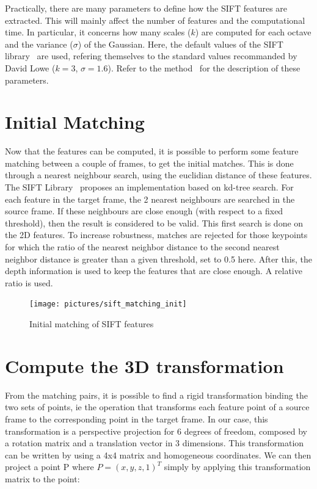 Practically, there are many parameters to define how the SIFT features are extracted. This will mainly affect the number of features and the computational time. In particular, it concerns how many scales ($k$) are computed for each octave and the variance ($\sigma$) of the Gaussian. Here, the default values of the SIFT library~\cite{hess_sift} are used, refering themselves to the standard values recommanded by David Lowe ($k=3$, $\sigma=1.6$). Refer to the method~\cite{lowe_2004_sift} for the description of these parameters.

\section{Initial Matching}

Now that the features can be computed, it is possible to perform some feature matching between a couple of frames, to get the initial matches. This is done through a nearest neighbour search, using the euclidian distance of these features.  
The SIFT Library~\cite{hess_sift} proposes an implementation based on kd-tree search. For each feature in the target frame, the 2 nearest neighbours are searched in the source frame. If these neighbours are close enough (with respect to a fixed threshold), then the result is considered to be valid. This first search is done on the 2D features. To increase robustness, matches are rejected for those keypoints for which the ratio of the nearest neighbor distance to the second nearest neighbor distance is greater than a given threshold, set to 0.5 here. 
After this, the depth information is used to keep the features that are close enough. A relative ratio is used.

\begin{figure}[h!]
\centering
\texttt{[image: pictures/sift\_matching\_init]}
\caption{Initial matching of SIFT features}
\end{figure}

\section{Compute the 3D transformation}

From the matching pairs, it is possible to find a rigid transformation binding the two sets of points, ie the operation that transforms each feature point of a source frame to the corresponding point in the target frame. In our case, this transformation is a perspective projection for 6 degrees of freedom, composed by a rotation matrix and a translation vector in 3 dimensions. This transformation can be written by using a 4x4  matrix and homogeneous coordinates. We can then project a point P where $P = (x,y,z,1)^T$ simply by applying this transformation matrix to the point:

